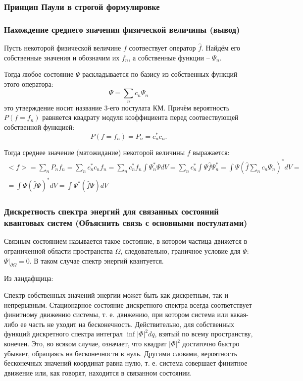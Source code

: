 \subsubsection{Принцип Паули в строгой формулировке}



\subsubsection{Нахождение среднего значения физической величины (вывод)}

Пусть некоторой физической величине $f$ соотвествует оператор $\hat{f}$. Найдём его собственные значения и обозначим их $f_n$, а собственные функции -- $\Psi_n$.

Тогда любое состояние $\Psi$ раскладывается по базису из собственных функций этого оператора:
\[
  \Psi = \sum_n c_n \Psi_n
\]
это утверждение носит название 3-его постулата КМ. Причём вероятность $P(f = f_n)$ равняется квадрату модуля коэффициента перед соотвествующей собственной функцией:
\[
  P(f = f_n) = P_n = c_n^* c_n.
\]

Тогда среднее значение (матожидание) некоторой величины $f$ выражается:
\begin{multline*}
  <f> = \sum_n P_n f_n
  = \sum_n c_n^* c_n f_n
  = \sum_n c_n^* f_n \int \Psi_n^* \Psi dV
  = \sum_n c_n^* \int \Psi \hat{f} \Psi_n^*
  = \int \Psi (\hat{f} \sum_n c_n \Psi_n)^* dV = \\
  = \int \Psi (\hat{f} \Psi)^* dV
  = \int \Psi^* (\hat{f} \Psi) dV
\end{multline*}

\subsubsection{Дискретность спектра энергий для связанных состояний квантовых систем
(Объяснить связь с основными постулатами)}

Связным состоянием называется такое состояние, в котором частица движется в ограниченной области
пространства $\Omega$, следовательно, граничное условие для $\Psi$:
$\left. \Psi \right|_{\partial \Omega} = 0$. В таком случае спектр энергий квантуется.

Из ландафщица:

Спектр собственных значений энергии может быть как дискретным, так и непрерывным.
Стационарное состояние дискретного спектра всегда соответствует финитному движению
системы, т. е. движению, при котором система или какая-либо ее часть не уходит на
бесконечность. Действительно, для собственных функций дискретного спектра интеграл
$\inf |\Phi|^2 dq$, взятый по всему пространству, конечен. Это, во всяком случае,
означает, что квадрат $|\Phi|^2$ достаточно быстро убывает, обращаясь на бесконечности в
нуль. Другими словами, вероятность бесконечных значений координат равна нулю, т. е.
система совершает финитное движение или, как говорят, находится в связанном состоянии.


